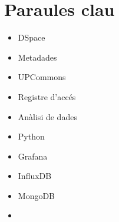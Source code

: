 \clearpage
\section*{Paraules clau}\label{sec:keywords-ca}
\begin{multicols}{2}
    \begin{itemize}
        \item DSpace
        \item Metadades
        \item UPCommons
        \item Registre d’accés
        \item Anàlisi de dades
    \end{itemize}
    \columnbreak
    \begin{itemize}
        \item Python
        \item Grafana
        \item InfluxDB
        \item MongoDB
        \item[]
    \end{itemize}
\end{multicols}